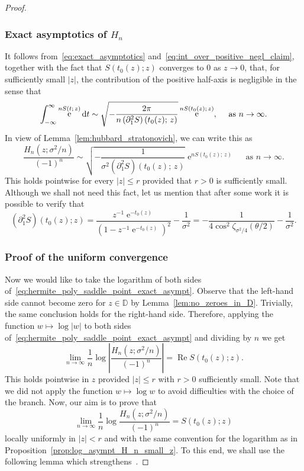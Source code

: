\documentclass[10pt]{amsart}
\theoremstyle{definition}\newtheorem{defi}[theo]{Definition}\newtheorem{rema}[theo]{Remark}\newtheorem{exam}[theo]{Example}\newtheorem{exem}[theo]{Example}\newtheorem{nota}[theo]{Notation}
\DeclareMathOperator{\Ree}{Re}
\DeclareMathOperator{\eee}{e}
\newcommand{\bD}{\mathbb{D}}
\newcommand*\dint{\text{\normalfont d}}
\begin{document}
\begin{proof}
\subsubsection*{Exact asymptotics of $H_n$}

It follows from~\eqref{eq:exact_asymptotics} and~\eqref{eq:int_over_positive_negl_claim}, together with the fact that $S(t_0(z);z)$ converges to $0$ as $z\to 0$, that, for sufficiently small $|z|$, the contribution of the positive half-axis is negligible in the sense that
\[
\int_{-\infty}^\infty \eee^{n S(t;\,z)} \dint t
\sim
\sqrt{-\frac{2\pi}{n \left(\partial_1^2 S\right)(t_0(z);\,z)}} \eee^{n S(t_0(z);\,z)},
\quad
\text{ as } n\to\infty.
\]
In view of Lemma~\ref{lem:hubbard_stratonovich}, we can write this as
\begin{equation}\label{eq:hermite_poly_saddle_point_exact_asympt}
\frac{H_n(z;\sigma^2/n)}{(-1)^n} \sim \sqrt{-\frac{1}{\sigma^2 (\partial_1^2 S)(t_0(z);\,z)}} \eee^{n S(t_0(z);\,z)}
\quad
\text{ as } n\to\infty.
\end{equation}
This holds pointwise for every $|z| \leq r$ provided that $r>0$ is sufficiently small. Although we shall not need this fact, let us mention that after some work it is possible to verify that
\begin{equation}\label{eq:second_der_S}
\left(\partial_1^2 S\right)(t_0(z); z) =
\frac{z^{-1}\eee^{-t_0(z)}}{\left(1 - z^{-1}\eee^{-t_0(z)}\right)^2} - \frac 1 {\sigma^2} = -\frac{1}{4 \cos^2 \zeta_{\sigma^2/4}(\theta/2)} - \frac 1 {\sigma^2}.
\end{equation}

\subsubsection*{Proof of the uniform convergence}

Now we would like to take the logarithm of both sides of~\eqref{eq:hermite_poly_saddle_point_exact_asympt}. Observe that the left-hand side cannot become zero for $z\in \bD$ by Lemma~\ref{lem:no_zeroes_in_D}. Trivially, the same conclusion holds for the right-hand side. Therefore, applying the function $w\mapsto \log |w|$ to both sides of~\eqref{eq:hermite_poly_saddle_point_exact_asympt} and dividing by $n$ we get
\begin{equation}\label{eq:asympt_H_n_proof_Re}
\lim_{n\to\infty} \frac 1n \log \left|\frac{H_n\left(z;\sigma^2/n\right)}{(-1)^n}\right| =
\Ree S(t_0(z);z).
\end{equation}
This holds pointwise in $z$ provided $|z| \leq r$ with $r>0$ sufficiently small. Note that we did not apply the function $w\mapsto \log w$ to avoid difficulties with the choice of the branch. Now, our aim is to prove that
\begin{equation}\label{eq:asympt_H_n_proof_no_Re}
\lim_{n\to\infty} \frac 1n \log\frac{H_n\left(z;\sigma^2/n\right)}{(-1)^n} = S(t_0(z);z)
\end{equation}
locally uniformly in $|z| < r$ and with the same convention for the logarithm as in Proposition~\ref{prop:log_asympt_H_n_small_z}. To this end, we shall use the following lemma which strengthens~\cite[Lemma~3.8]{kabluchko_rep_diff_free_poi}.


\end{proof}
\end{document}
